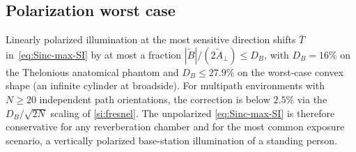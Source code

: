 \documentclass[journal,twocolumn,10pt]{IEEEtran}
\theoremstyle{plain}
\theoremstyle{remark}
\newcommand{\Tbar}{\bar{T}}
\begin{document}
\subsection{Polarization worst case}
Linearly polarized illumination at the most sensitive direction
shifts $\Tbar$ in~\eqref{eq:Sinc-max-SI} by at most a fraction
$|\tilde{B}|/(2\tilde A_\perp) \le D_B$, with $D_B = 16\%$ on the
Thelonious anatomical phantom and $D_B \le 27.9\%$ on the
worst-case convex shape (an infinite cylinder at broadside). For
multipath environments with $N \ge 20$ independent path
orientations, the correction is below $2.5\%$ via the
$D_B/\sqrt{2N}$ scaling of \cref{si:fresnel}. The unpolarized
\eqref{eq:Sinc-max-SI} is therefore conservative for any
reverberation chamber and for the most common exposure scenario, a
vertically polarized base-station illumination of a standing
person.
\end{document}
